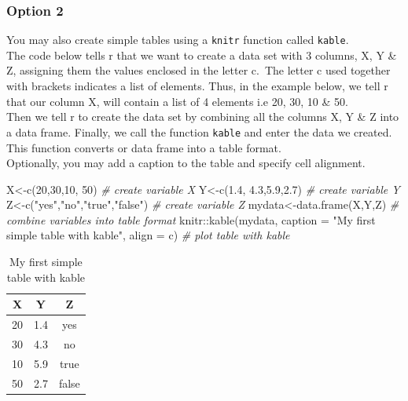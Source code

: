 \documentclass[
]{book}
\newenvironment{Shaded}{\begin{snugshade}}{\end{snugshade}}
\newcommand{\AttributeTok}[1]{\textcolor[rgb]{0.77,0.63,0.00}{#1}}
\newcommand{\CommentTok}[1]{\textcolor[rgb]{0.56,0.35,0.01}{\textit{#1}}}
\newcommand{\DecValTok}[1]{\textcolor[rgb]{0.00,0.00,0.81}{#1}}
\newcommand{\FloatTok}[1]{\textcolor[rgb]{0.00,0.00,0.81}{#1}}
\newcommand{\FunctionTok}[1]{\textcolor[rgb]{0.00,0.00,0.00}{#1}}
\newcommand{\NormalTok}[1]{#1}
\newcommand{\OtherTok}[1]{\textcolor[rgb]{0.56,0.35,0.01}{#1}}
\newcommand{\SpecialCharTok}[1]{\textcolor[rgb]{0.00,0.00,0.00}{#1}}
\newcommand{\StringTok}[1]{\textcolor[rgb]{0.31,0.60,0.02}{#1}}
\begin{document}
\hypertarget{option-2}{%
\subsubsection{Option 2}\label{option-2}}

You may also create simple tables using a \texttt{knitr} function called \texttt{kable}.\\
The code below tells r that we want to create a data set with 3 columns, X, Y \& Z, assigning them the values enclosed in the letter c.~The letter c used together with brackets indicates a list of elements. Thus, in the example below, we tell r that our column X, will contain a list of 4 elements i.e 20, 30, 10 \& 50.\\
Then we tell r to create the data set by combining all the columns X, Y \& Z into a data frame.
Finally, we call the function \texttt{kable} and enter the data we created. This function converts or data frame into a table format.\\
Optionally, you may add a caption to the table and specify cell alignment.

\begin{Shaded}
\begin{Highlighting}[]
\NormalTok{X}\OtherTok{\textless{}{-}}\FunctionTok{c}\NormalTok{(}\DecValTok{20}\NormalTok{,}\DecValTok{30}\NormalTok{,}\DecValTok{10}\NormalTok{, }\DecValTok{50}\NormalTok{)    }\CommentTok{\# create variable X}
\NormalTok{Y}\OtherTok{\textless{}{-}}\FunctionTok{c}\NormalTok{(}\FloatTok{1.4}\NormalTok{, }\FloatTok{4.3}\NormalTok{,}\FloatTok{5.9}\NormalTok{,}\FloatTok{2.7}\NormalTok{)    }\CommentTok{\# create variable Y}
\NormalTok{Z}\OtherTok{\textless{}{-}}\FunctionTok{c}\NormalTok{(}\StringTok{"yes"}\NormalTok{,}\StringTok{"no"}\NormalTok{,}\StringTok{"true"}\NormalTok{,}\StringTok{"false"}\NormalTok{)   }\CommentTok{\# create variable Z}
\NormalTok{mydata}\OtherTok{\textless{}{-}}\FunctionTok{data.frame}\NormalTok{(X,Y,Z) }\CommentTok{\# combine variables into table format}
\NormalTok{knitr}\SpecialCharTok{::}\FunctionTok{kable}\NormalTok{(mydata, }\AttributeTok{caption =} \StringTok{"My first simple table with kable"}\NormalTok{, }\AttributeTok{align =} \StringTok{\textquotesingle{}c\textquotesingle{}}\NormalTok{) }\CommentTok{\# plot table with kable}
\end{Highlighting}
\end{Shaded}

\begin{table}

\caption{\label{tab:kable}My first simple table with kable}
\centering
\begin{tabular}[t]{c|c|c}
\hline
X & Y & Z\\
\hline
20 & 1.4 & yes\\
\hline
30 & 4.3 & no\\
\hline
10 & 5.9 & true\\
\hline
50 & 2.7 & false\\
\hline
\end{tabular}
\end{table}
\end{document}
